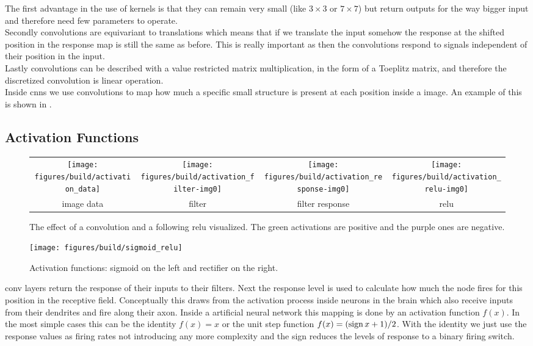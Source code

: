 The first advantage in the use of kernels is that they can remain very small (like $3\times 3$ or $7\times 7$) but return outputs for the way bigger input and therefore need few parameters to operate.\\
Secondly convolutions are equivariant to translations which means that if we translate the input somehow the response at the shifted position in the response map is still the same as before. This is really important as then the convolutions respond to signals independent of their position in the input.\\
Lastly convolutions can be described with a value restricted matrix multiplication, in the form of a Toeplitz matrix, and therefore the discretized convolution is linear operation.\\
Inside \glspl{cnn} we use convolutions to map how much a specific small structure is present at each position inside a image. An example of this is shown in .

\subsection{Activation Functions} %
\label{sub:conepts:nn:activations}
\begin{figure}
    \centering
    \begin{tabulary}{\linewidth}{CCCC}
        \texttt{[image: figures/build/activation\_data]} &
        \vspace{-1.8cm}\texttt{[image: figures/build/activation\_filter-img0]} &
        \texttt{[image: figures/build/activation\_response-img0]} &
        \texttt{[image: figures/build/activation\_relu-img0]} \\
        image data & filter & filter response & \gls{relu} \\
    \end{tabulary}
    \caption{The effect of a convolution and a following \gls{relu} visualized. The green activations are positive and the purple ones are negative.}
\end{figure}
\begin{figure}
    \texttt{[image: figures/build/sigmoid\_relu]}
    \caption{Activation functions: sigmoid on the left and rectifier on the right.}
    \label{fig:sigmoid_relu}
\end{figure}
\gls{conv} layers return the response of their inputs to their filters. Next the response level is used to calculate how much the node fires for this position in the receptive field. Conceptually this draws from the activation process inside neurons in the brain which also receive inputs from their dendrites and fire along their axon. Inside a artificial neural network this mapping is done by an activation function $f(x)$. In the most simple cases this can be the identity $f(x) = x$ or the unit step function $f(x) = (\operatorname{sign} x + 1) / 2$. With the identity we just use the response values as firing rates not introducing any more complexity and the sign reduces the levels of response to a binary firing switch.

